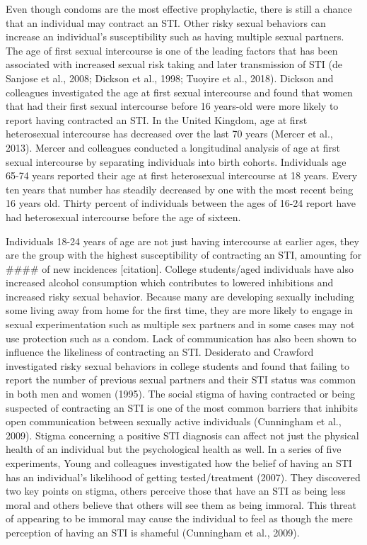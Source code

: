 \documentclass[
  english,
  donotrepeattitle,doc, 12pt, a4paper,floatsintext]{apa7}
\begin{document}
Even though condoms are the most effective prophylactic, there is still a chance that an individual may contract an STI. Other risky sexual behaviors can increase an individual's susceptibility such as having multiple sexual partners. The age of first sexual intercourse is one of the leading factors that has been associated with increased sexual risk taking and later transmission of STI (de Sanjose et al., 2008; Dickson et al., 1998; Tuoyire et al., 2018). Dickson and colleagues investigated the age at first sexual intercourse and found that women that had their first sexual intercourse before 16 years-old were more likely to report having contracted an STI. In the United Kingdom, age at first heterosexual intercourse has decreased over the last 70 years (Mercer et al., 2013). Mercer and colleagues conducted a longitudinal analysis of age at first sexual intercourse by separating individuals into birth cohorts. Individuals age 65-74 years reported their age at first heterosexual intercourse at 18 years. Every ten years that number has steadily decreased by one with the most recent being 16 years old. Thirty percent of individuals between the ages of 16-24 report have had heterosexual intercourse before the age of sixteen.

Individuals 18-24 years of age are not just having intercourse at earlier ages, they are the group with the highest susceptibility of contracting an STI, amounting for \#\#\#\# of new incidences {[}citation{]}. College students/aged individuals have also increased alcohol consumption which contributes to lowered inhibitions and increased risky sexual behavior. Because many are developing sexually including some living away from home for the first time, they are more likely to engage in sexual experimentation such as multiple sex partners and in some cases may not use protection such as a condom.
Lack of communication has also been shown to influence the likeliness of contracting an STI. Desiderato and Crawford investigated risky sexual behaviors in college students and found that failing to report the number of previous sexual partners and their STI status was common in both men and women (1995). The social stigma of having contracted or being suspected of contracting an STI is one of the most common barriers that inhibits open communication between sexually active individuals (Cunningham et al., 2009). Stigma concerning a positive STI diagnosis can affect not just the physical health of an individual but the psychological health as well. In a series of five experiments, Young and colleagues investigated how the belief of having an STI has an individual's likelihood of getting tested/treatment (2007). They discovered two key points on stigma, others perceive those that have an STI as being less moral and others believe that others will see them as being immoral. This threat of appearing to be immoral may cause the individual to feel as though the mere perception of having an STI is shameful (Cunningham et al., 2009).
\end{document}
